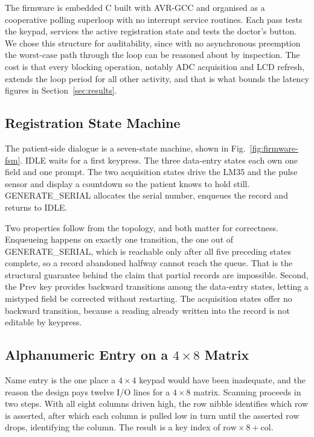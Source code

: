 The firmware is embedded C built with AVR-GCC and organised as a cooperative polling superloop with
no interrupt service routines. Each pass tests the keypad, services the active registration state
and tests the doctor's button. We chose this structure for auditability, since with no asynchronous
preemption the worst-case path through the loop can be reasoned about by inspection. The cost is
that every blocking operation, notably ADC acquisition and LCD refresh, extends the loop period for
all other activity, and that is what bounds the latency figures in Section~\ref{sec:results}.

\subsection{Registration State Machine}
The patient-side dialogue is a seven-state machine, shown in Fig.~\ref{fig:firmware-fsm}.
\textsf{IDLE} waits for a first keypress. The three data-entry states each own one field and one
prompt. The two acquisition states drive the LM35 and the pulse sensor and display a countdown so
the patient knows to hold still. \textsf{GENERATE\_SERIAL} allocates the serial number, enqueues the
record and returns to \textsf{IDLE}.



Two properties follow from the topology, and both matter for correctness. Enqueueing happens on exactly
one transition, the one out of \textsf{GENERATE\_SERIAL}, which is reachable only after all five
preceding states complete, so a record abandoned halfway cannot reach the queue. That is the
structural guarantee behind the claim that partial records are impossible. Second, the
\textsf{Prev} key provides backward transitions among the data-entry states, letting a mistyped field
be corrected without restarting. The acquisition states offer no backward transition, because a
reading already written into the record is not editable by keypress.

\subsection{Alphanumeric Entry on a $4\times8$ Matrix}
Name entry is the one place a $4\times4$ keypad would have been inadequate, and the reason the design
pays twelve I/O lines for a $4\times8$ matrix. Scanning proceeds in two steps. With all eight columns
driven high, the row nibble identifies which row is asserted, after which each column is pulled low
in turn until the asserted row drops, identifying the column. The result is a key index of
$\mathrm{row} \times 8 + \mathrm{col}$.


